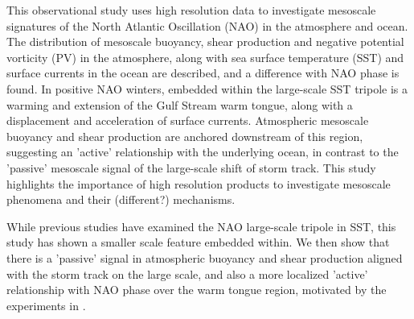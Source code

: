 This observational study uses high resolution data to investigate mesoscale signatures of the North Atlantic Oscillation (NAO) in the atmosphere and ocean.  The distribution of mesoscale buoyancy, shear production and negative potential vorticity (PV) in the atmosphere, along with sea surface temperature (SST) and surface currents in the ocean are described, and a difference with NAO phase is found.
In positive NAO winters, embedded within the large-scale SST tripole is a warming and extension of the Gulf Stream warm tongue, along with a displacement and acceleration of surface currents. Atmospheric mesoscale buoyancy and shear production are anchored downstream of this region, suggesting an 'active' relationship with the underlying ocean, in contrast to the 'passive' mesoscale signal of the large-scale shift of storm track. 
This study highlights the importance of high resolution products to investigate mesoscale phenomena and their (different?) mechanisms.






While previous studies have examined the NAO large-scale tripole in SST, this study has shown a smaller scale feature embedded within. We then show that there is a 'passive' signal in atmospheric buoyancy and shear production aligned with the storm track on the large scale, and also a more localized 'active' relationship with NAO phase over the warm tongue region, motivated by the experiments in \citet{sheldon2017warm}.

